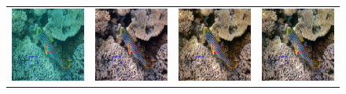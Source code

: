 \documentclass[conference,reqno]{IEEEtran}
\begin{document}
\begin{figure}
\centering
\begin{tabular}{p{4.0cm} p{4.0cm} p{4.0cm} p{4.0cm}}
   
   \includegraphics[width=1.7in]{flickr_cmp} &
   \includegraphics[width=1.7in]{cgan_cmp} &
   \includegraphics[width=1.7in]{ugan_cmp} &
   \includegraphics[width=1.7in]{uganp_cmp} \\

\end{tabular}
\end{figure}
\end{document}
